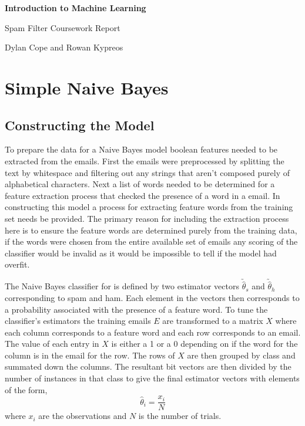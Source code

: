 \documentclass[12pt, a4paper]{article}
\begin{document}
	\begin{center}
	{ \Large \bf Introduction to Machine Learning }

  \end{center}
  \begin{center}
    \vspace{.1in}

    Spam Filter Coursework Report

    Dylan Cope and Rowan Kypreos

	\vspace{.2in}

	\end{center}

  \section{Simple Naive Bayes}

  \subsection{Constructing the Model} \label{classconstr}


  To prepare the data for a Naive Bayes model boolean features needed to be extracted from the emails. First the emails were preprocessed by splitting the text by whitespace and filtering out any strings that aren't composed purely of alphabetical characters. Next a list of words needed to be determined for a feature extraction process that checked the presence of a word in a email. In constructing this model a process for extracting feature words from the training set needs be provided. The primary reason for including the extraction process here is to ensure the feature words are determined purely from the training data, if the words were chosen from the entire available set of emails any scoring of the classifier would be invalid as it would be impossible to tell if the model had overfit.

  The Naive Bayes classifier for is defined by two estimator vectors $\utilde{\hat{\theta}}_s$ and $\utilde{\hat{\theta}}_h$ corresponding to spam and ham. Each element in the vectors then corresponds to a probability associated with the presence of a feature word. To tune the classifier's estimators the training emails $E$ are transformed to a matrix $X$ where each column corresponds to a feature word and each row corresponds to an email. The value of each entry in $X$ is either a 1 or a 0 depending on if the word for the column is in the email for the row. The rows of $X$ are then grouped by class and summated down the columns. The resultant bit vectors are then divided by the number of instances in that class to give the final estimator vectors with elements of the form,
  $$ \hat{\theta}_i = \frac{x_i}{N} $$
  where $x_i$ are the observations and $N$ is the number of trials.
\end{document}
